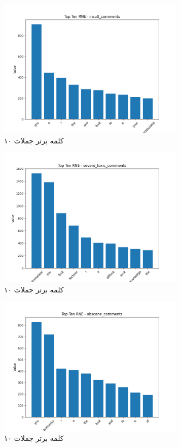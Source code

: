 \begin{figure}
  \centering
  \includegraphics[width=0.8\textwidth]{stats/top_ten_RNE_insult_comments.png}
  \caption{۱۰ کلمه برتر جملات }
  \label{fig:unique_common_words_total}
\end{figure}

\begin{figure}
  \centering
  \includegraphics[width=0.8\textwidth]{stats/top_ten_RNE_severe_toxic_comments.png}
  \caption{۱۰ کلمه برتر جملات }
  \label{fig:unique_uncommon_words_count}
\end{figure}

\begin{figure}
  \centering
  \includegraphics[width=0.8\textwidth]{stats/top_ten_RNE_obscene_comments.png}
  \caption{۱۰ کلمه برتر جملات }
  \label{fig:unique_common_words_total}
\end{figure}

